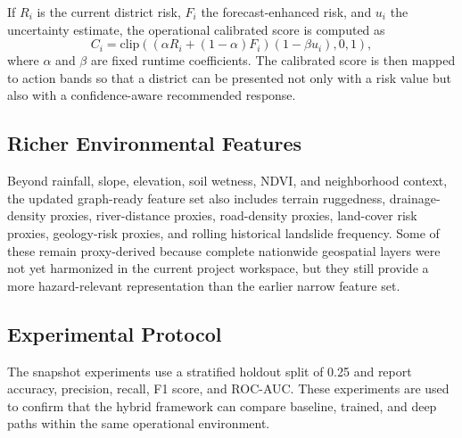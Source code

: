 \documentclass[pdflatex,sn-mathphys-num]{sn-jnl}
\begin{document}
If $R_i$ is the current district risk, $F_i$ the forecast-enhanced risk, and $u_i$ the uncertainty estimate, the operational calibrated score is computed as
\begin{equation}
C_i = \mathrm{clip}\left(\left(\alpha R_i + (1-\alpha)F_i\right)\left(1-\beta u_i\right), 0, 1\right),
\label{eq:calibrated_score}
\end{equation}
where $\alpha$ and $\beta$ are fixed runtime coefficients. The calibrated score is then mapped to action bands so that a district can be presented not only with a risk value but also with a confidence-aware recommended response.

\subsection{Richer Environmental Features}

Beyond rainfall, slope, elevation, soil wetness, NDVI, and neighborhood context, the updated graph-ready feature set also includes terrain ruggedness, drainage-density proxies, river-distance proxies, road-density proxies, land-cover risk proxies, geology-risk proxies, and rolling historical landslide frequency. Some of these remain proxy-derived because complete nationwide geospatial layers were not yet harmonized in the current project workspace, but they still provide a more hazard-relevant representation than the earlier narrow feature set.

\subsection{Experimental Protocol}

The snapshot experiments use a stratified holdout split of 0.25 and report accuracy, precision, recall, F1 score, and ROC-AUC. These experiments are used to confirm that the hybrid framework can compare baseline, trained, and deep paths within the same operational environment.
\end{document}
